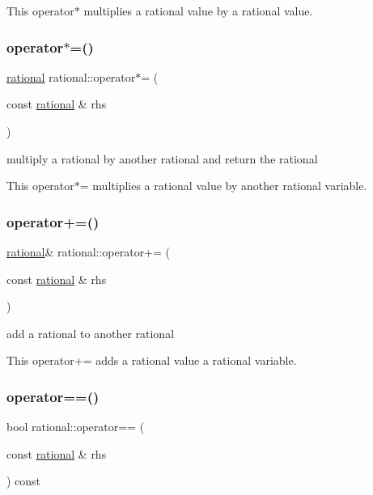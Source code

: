This operator$\ast$ multiplies a rational value by a rational value. \mbox{\label{classrational_a2b5729aef261d16cd18ff7c7fcbf8c6e}} 
\subsubsection{\texorpdfstring{operator$\ast$=()}{operator*=()}}
{\footnotesize\ttfamily \hyperlink{classrational}{rational} rational\+::operator$\ast$= (\begin{DoxyParamCaption}\item[{const \hyperlink{classrational}{rational} \&}]{rhs }\end{DoxyParamCaption})\hspace{0.3cm}{\ttfamily [inline]}}



multiply a rational by another rational and return the rational 

This operator$\ast$= multiplies a rational value by another rational variable. \mbox{\label{classrational_a9b83ad0c803d2ac242b42e71d954a356}} 
\subsubsection{\texorpdfstring{operator+=()}{operator+=()}}
{\footnotesize\ttfamily \hyperlink{classrational}{rational}\& rational\+::operator+= (\begin{DoxyParamCaption}\item[{const \hyperlink{classrational}{rational} \&}]{rhs }\end{DoxyParamCaption})\hspace{0.3cm}{\ttfamily [inline]}}



add a rational to another rational 

This operator+= adds a rational value a rational variable. \mbox{\label{classrational_a8b565720ea15ddfb17ea202e27698478}} 
\subsubsection{\texorpdfstring{operator==()}{operator==()}}
{\footnotesize\ttfamily bool rational\+::operator== (\begin{DoxyParamCaption}\item[{const \hyperlink{classrational}{rational} \&}]{rhs }\end{DoxyParamCaption}) const\hspace{0.3cm}{\ttfamily [inline]}}



